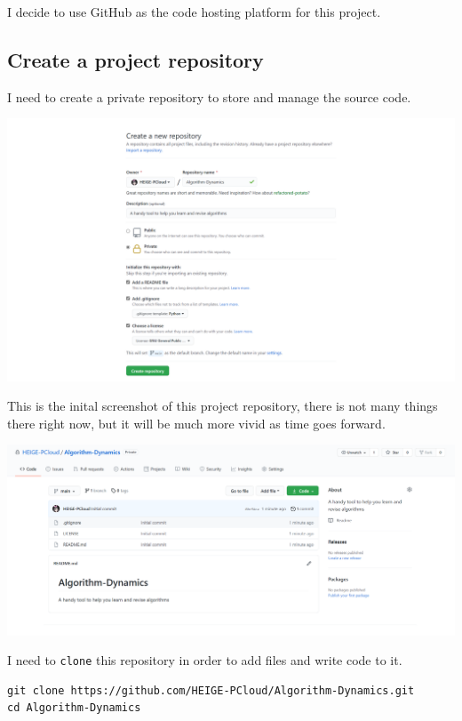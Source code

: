 \documentclass[a4paper]{report}
\begin{document}
I decide to use GitHub as the code hosting platform for this project.

\subsection{Create a project repository}

I need to create a private repository to store and manage the source code.

\includegraphics[width=\linewidth]{Create-a-New-Repository}

This is the inital screenshot of this project repository, there is not many things there right now, but it will be much more vivid as time goes forward.

\includegraphics[width=\linewidth]{HEIGE-PCloud-Algorithm-Dynamics-A-handy-tool-to-help-you-learn-and-revise-algorithms}

I need to \texttt{clone} this repository in order to add files and write code to it.

\begin{verbatim}
git clone https://github.com/HEIGE-PCloud/Algorithm-Dynamics.git
cd Algorithm-Dynamics
\end{verbatim}
\end{document}
